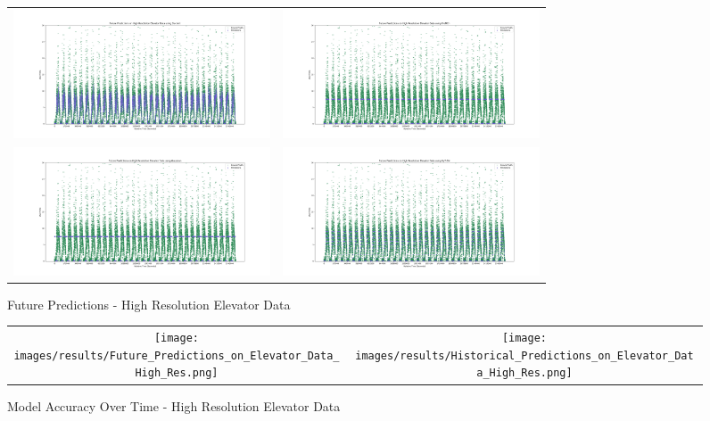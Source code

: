 \begin{figure}
  \begin{tabular}{cc}
    {\includegraphics[width = 3in]{images/results/Future_high_res_elevator_Duckett.png}} &
    {\includegraphics[width = 3in]{images/results/Future_high_res_elevator_FreMEn.png}} \\
    {\includegraphics[width = 3in]{images/results/Future_high_res_elevator_Gaussian.png}} &
    {\includegraphics[width = 3in]{images/results/Future_high_res_elevator_HyT-EM.png}} \\
  \end{tabular}
  \caption{Future Predictions - High Resolution Elevator Data}
  \label{figure:Future_Predictions_-_High_Resolution_Elevator_Data}
\end{figure}

\begin{figure}
  \begin{tabular}{cc}
    {\texttt{[image: images/results/Future\_Predictions\_on\_Elevator\_Data\_High\_Res.png]}} &
    {\texttt{[image: images/results/Historical\_Predictions\_on\_Elevator\_Data\_High\_Res.png]}} \\
  \end{tabular}
  \caption{Model Accuracy Over Time - High Resolution Elevator Data}
  \label{figure:Model_Accuracy_Over_Time_-_High_Resolution_Elevator_Data}
\end{figure}


